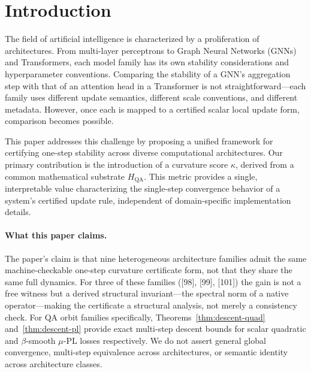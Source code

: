 \documentclass[11pt]{article}
\theoremstyle{definition}
\theoremstyle{remark}
\newcommand{\hqa}{H_{\mathrm{QA}}}
\begin{document}
\section{Introduction}

The field of artificial intelligence is characterized by a proliferation of
architectures. From multi-layer perceptrons to Graph Neural Networks (GNNs) and
Transformers, each model family has its own stability considerations and hyperparameter
conventions. Comparing the stability of a GNN's aggregation step with that of an
attention head in a Transformer is not straightforward---each family uses different
update semantics, different scale conventions, and different metadata. However, once
each is mapped to a certified scalar local update form, comparison becomes possible.

This paper addresses this challenge by proposing a unified framework for certifying
one-step stability across diverse computational architectures. Our primary
contribution is the introduction of a curvature score $\kappa$, derived from a
common mathematical substrate $\hqa$. This metric provides a single, interpretable
value characterizing the single-step convergence behavior of a system's certified
update rule, independent of domain-specific implementation details.

\paragraph{What this paper claims.}
The paper's claim is that nine heterogeneous architecture families admit the same
machine-checkable one-step curvature certificate form, not that they share the same
full dynamics. For three of these families ([98], [99], [101]) the gain is not a
free witness but a derived structural invariant---the spectral norm of a native
operator---making the certificate a structural analysis, not merely a consistency
check. For QA orbit families specifically, Theorems~\ref{thm:descent-quad}
and~\ref{thm:descent-pl} provide exact multi-step descent bounds for scalar
quadratic and $\beta$-smooth $\mu$-PL losses respectively. We do not assert general
global convergence, multi-step equivalence across architectures, or semantic identity
across architecture classes.
\end{document}
